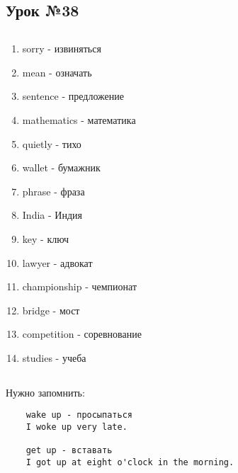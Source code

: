 \subsection{Урок №38}

\subsection*{}
\begin{multicols}{2}
    \begin{enumerate}\setlength{\itemsep}{0pt}
        \item sorry - извиняться
        \item mean - означать
        \item sentence - предложение
        \item mathematics - математика
        \item quietly - тихо
        \item wallet - бумажник
        \item phrase - фраза
        \item India - Индия
        \item key - ключ
        \item lawyer - адвокат
        \item championship - чемпионат
        \item bridge - мост
        \item competition - соревнование
        \item studies - учеба
    \end{enumerate}
\end{multicols}

\subsection*{}
Нужно запомнить:
\begin{verbatim}
    wake up - просыпаться
    I woke up very late.

    get up - вставать
    I got up at eight o'clock in the morning.
\end{verbatim}
